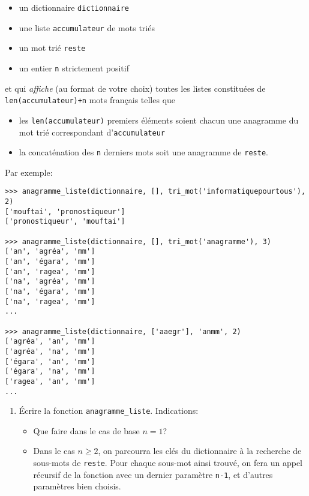 \documentclass[10pt]{article}
\begin{document}
\begin{itemize}
\item un dictionnaire \verb+dictionnaire+
\item une liste \verb+accumulateur+ de mots triés
\item un mot trié \verb+reste+
\item un entier \verb+n+ strictement positif
\end{itemize}

et qui \emph{affiche} (au format de votre choix) toutes les listes constituées de
\verb-len(accumulateur)+n- mots français telles que

\begin{itemize}
\item les \verb+len(accumulateur)+ premiers éléments soient chacun une anagramme du mot trié correspondant d'\verb+accumulateur+
\item la concaténation des \verb+n+ derniers mots soit une anagramme de \verb+reste+.
\end{itemize}

Par exemple:

\begin{verbatim}
>>> anagramme_liste(dictionnaire, [], tri_mot('informatiquepourtous'), 2)
['mouftai', 'pronostiqueur']
['pronostiqueur', 'mouftai']

>>> anagramme_liste(dictionnaire, [], tri_mot('anagramme'), 3)
['an', 'agréa', 'mm']
['an', 'égara', 'mm']
['an', 'ragea', 'mm']
['na', 'agréa', 'mm']
['na', 'égara', 'mm']
['na', 'ragea', 'mm']
...

>>> anagramme_liste(dictionnaire, ['aaegr'], 'anmm', 2)
['agréa', 'an', 'mm']
['agréa', 'na', 'mm']
['égara', 'an', 'mm']
['égara', 'na', 'mm']
['ragea', 'an', 'mm']
...
\end{verbatim}

\begin{enumerate}[resume]
\item Écrire la fonction \verb+anagramme_liste+. Indications:
  \begin{itemize}
  \item Que faire dans le cas de base $n=1$?
  \item Dans le cas $n\geq 2$, on parcourra les clés du dictionnaire à
    la recherche de sous-mots de \verb+reste+. Pour chaque sous-mot
    ainsi trouvé, on fera un appel récursif de la fonction avec un
    dernier paramètre \verb+n-1+, et d'autres paramètres bien choisis.
  \end{itemize}
\end{enumerate}
\end{document}
